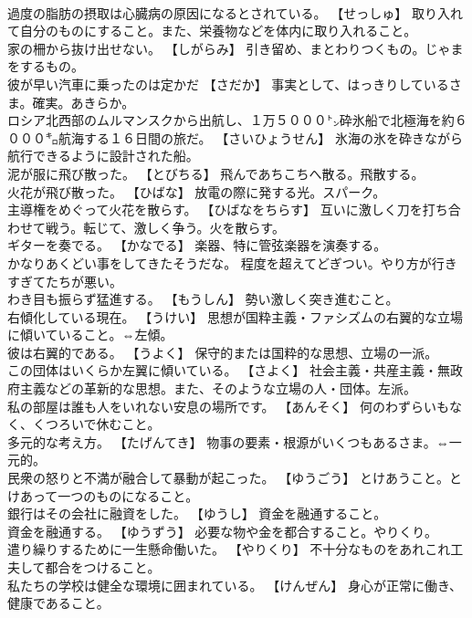 \documentclass[8pt]{extreport}
\begin{document}
\begin{CJK}{UTF8}{min}
\\	過度の脂肪の摂取は心臓病の原因になるとされている。	【せっしゅ】 取り入れて自分のものにすること。また、栄養物などを体内に取り入れること。
\\	家の柵から抜け出せない。	【しがらみ】 引き留め、まとわりつくもの。じゃまをするもの。
\\	彼が早い汽車に乗ったのは定かだ	【さだか】 事実として、はっきりしているさま。確実。あきらか。
\\	ロシア北西部のムルマンスクから出航し、１万５０００㌧砕氷船で北極海を約６０００㌔航海する１６日間の旅だ。	【さいひょうせん】 氷海の氷を砕きながら航行できるように設計された船。
\\	泥が服に飛び散った。	【とびちる】 飛んであちこちへ散る。飛散する。
\\	火花が飛び散った。	【ひばな】 放電の際に発する光。スパーク。
\\	主導権をめぐって火花を散らす。	【ひばなをちらす】 互いに激しく刀を打ち合わせて戦う。転じて、激しく争う。火を散らす。
\\	ギターを奏でる。	【かなでる】 楽器、特に管弦楽器を演奏する。
\\	かなりあくどい事をしてきたそうだな。	程度を超えてどぎつい。やり方が行きすぎてたちが悪い。
\\	わき目も振らず猛進する。	【もうしん】 勢い激しく突き進むこと。
\\	右傾化している現在。	【うけい】 思想が国粋主義・ファシズムの右翼的な立場に傾いていること。⇔左傾。
\\	彼は右翼的である。	【うよく】 保守的または国粋的な思想、立場の一派。
\\	この団体はいくらか左翼に傾いている。	【さよく】 社会主義・共産主義・無政府主義などの革新的な思想。また、そのような立場の人・団体。左派。
\\	私の部屋は誰も人をいれない安息の場所です。	【あんそく】 何のわずらいもなく、くつろいで休むこと。
\\	多元的な考え方。	【たげんてき】 物事の要素・根源がいくつもあるさま。⇔一元的。
\\	民衆の怒りと不満が融合して暴動が起こった。	【ゆうごう】 とけあうこと。とけあって一つのものになること。
\\	銀行はその会社に融資をした。	【ゆうし】 資金を融通すること。
\\	資金を融通する。	【ゆうずう】 必要な物や金を都合すること。やりくり。
\\	遣り繰りするために一生懸命働いた。	【やりくり】 不十分なものをあれこれ工夫して都合をつけること。
\\	私たちの学校は健全な環境に囲まれている。	【けんぜん】 身心が正常に働き、健康であること。

\end{CJK}
\end{document}

